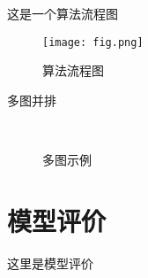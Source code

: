 \documentclass[bwprint]{gmcmthesis}
\begin{document}
这是一个算法流程图
\begin{figure}[htp!]
\centering
\texttt{[image: fig.png]}
\caption{算法流程图}
\end{figure}

多图并排
\begin{figure}[!htp]
	\centering
	\qquad
	 \\
	\qquad
	\caption{多图示例}
\end{figure}


\clearpage


\section{模型评价}

这里是模型评价




\cite{mittelbach_latex_2004,wright_latex3_2009,beeton_unicode_2008,vieth_experiences_2009}



\end{document}
